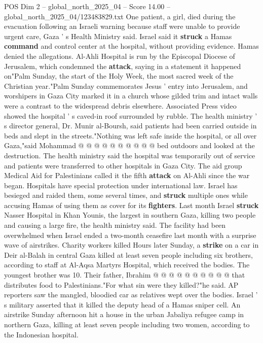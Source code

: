 \begin{textsample}{POS Dim 2 – global\_north\_2025\_04 – Score 14.00 – global\_north\_2025\_04/123483829.txt}  \label{ex:f2_pos_427}
One patient, a girl, died during the evacuation following an Israeli warning because staff were unable to provide urgent care, Gaza ' s Health Ministry said.
Israel said it \textbf{struck} a Hamas \textbf{command} and control center at the hospital, without providing evidence.
Hamas denied the allegations.
Al-Ahli Hospital is run by the Episcopal Diocese of Jerusalem, which condemned the \textbf{attack}, saying in a statement it happened on"Palm Sunday, the start of the Holy Week, the most sacred week of the Christian year."Palm Sunday commemorates Jesus ' entry into Jerusalem, and worshipers in Gaza City marked it in a church whose gilded trim and intact walls were a contrast to the widespread debris elsewhere.
Associated Press video showed the hospital ' s caved-in roof surrounded by rubble.
The health ministry ' s director general, Dr.
Munir al-Boursh, said patients had been carried outside in beds and slept in the streets."Nothing was left safe inside the hospital, or all over Gaza,"said Mohammad @ @ @ @ @ @ @ @ @ @ bed outdoors and looked at the destruction.
The health ministry said the hospital was temporarily out of service and patients were transferred to other hospitals in Gaza City.
The aid group Medical Aid for Palestinians called it the fifth \textbf{attack} on Al-Ahli since the war began.
Hospitals have special protection under international law.
Israel has besieged and raided them, some several times, and \textbf{struck} multiple ones while accusing Hamas of using them as cover for its \textbf{fighters}.
Last month Israel \textbf{struck} Nasser Hospital in Khan Younis, the largest in southern Gaza, killing two people and causing a large fire, the health ministry said.
The facility had been overwhelmed when Israel ended a two-month ceasefire last month with a surprise wave of airstrikes.
Charity workers killed Hours later Sunday, a \textbf{strike} on a car in Deir al-Balah in central Gaza killed at least seven people including six brothers, according to staff at Al-Aqsa Martyrs Hospital, which received the bodies.
The youngest brother was 10.
Their father, Ibrahim @ @ @ @ @ @ @ @ @ @ that distributes food to Palestinians."For what sin were they killed?"he said.
AP reporters saw the mangled, bloodied car as relatives wept over the bodies.
Israel ' s military asserted that it killed the deputy head of a Hamas sniper cell.
An airstrike Sunday afternoon hit a house in the urban Jabaliya refugee camp in northern Gaza, killing at least seven people including two women, according to the Indonesian hospital.

\end{textsample}
